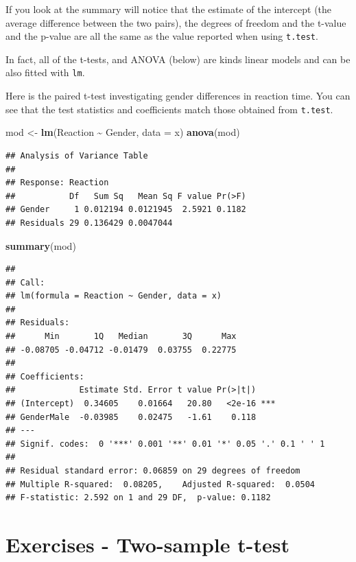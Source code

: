 \documentclass[
  a4paperpaper,
]{book}
\newenvironment{Shaded}{\begin{snugshade}}{\end{snugshade}}
\newcommand{\DataTypeTok}[1]{\textcolor[rgb]{0.13,0.29,0.53}{#1}}
\newcommand{\KeywordTok}[1]{\textcolor[rgb]{0.13,0.29,0.53}{\textbf{#1}}}
\newcommand{\NormalTok}[1]{#1}
\newcommand{\OperatorTok}[1]{\textcolor[rgb]{0.81,0.36,0.00}{\textbf{#1}}}
\newcommand{\StringTok}[1]{\textcolor[rgb]{0.31,0.60,0.02}{#1}}
\begin{document}
If you look at the summary will notice that the estimate of the intercept (the average difference between the two pairs), the degrees of freedom and the t-value and the p-value are all the same as the value reported when using \texttt{t.test}.

In fact, all of the t-tests, and ANOVA (below) are kinds linear models and can be also fitted with \texttt{lm}.

Here is the paired t-test investigating gender differences in reaction time. You can see that the test statistics and coefficients match those obtained from \texttt{t.test}.

\begin{Shaded}
\begin{Highlighting}[]
\NormalTok{mod \textless{}{-}}\StringTok{ }\KeywordTok{lm}\NormalTok{(Reaction }\OperatorTok{\textasciitilde{}}\StringTok{ }\NormalTok{Gender, }\DataTypeTok{data =}\NormalTok{ x)}
\KeywordTok{anova}\NormalTok{(mod)}
\end{Highlighting}
\end{Shaded}

\begin{verbatim}
## Analysis of Variance Table
## 
## Response: Reaction
##           Df   Sum Sq   Mean Sq F value Pr(>F)
## Gender     1 0.012194 0.0121945  2.5921 0.1182
## Residuals 29 0.136429 0.0047044
\end{verbatim}

\begin{Shaded}
\begin{Highlighting}[]
\KeywordTok{summary}\NormalTok{(mod)}
\end{Highlighting}
\end{Shaded}

\begin{verbatim}
## 
## Call:
## lm(formula = Reaction ~ Gender, data = x)
## 
## Residuals:
##      Min       1Q   Median       3Q      Max 
## -0.08705 -0.04712 -0.01479  0.03755  0.22775 
## 
## Coefficients:
##             Estimate Std. Error t value Pr(>|t|)    
## (Intercept)  0.34605    0.01664   20.80   <2e-16 ***
## GenderMale  -0.03985    0.02475   -1.61    0.118    
## ---
## Signif. codes:  0 '***' 0.001 '**' 0.01 '*' 0.05 '.' 0.1 ' ' 1
## 
## Residual standard error: 0.06859 on 29 degrees of freedom
## Multiple R-squared:  0.08205,	Adjusted R-squared:  0.0504 
## F-statistic: 2.592 on 1 and 29 DF,  p-value: 0.1182
\end{verbatim}

\hypertarget{exercises---two-sample-t-test}{%
\section{Exercises - Two-sample t-test}\label{exercises---two-sample-t-test}}
\end{document}
